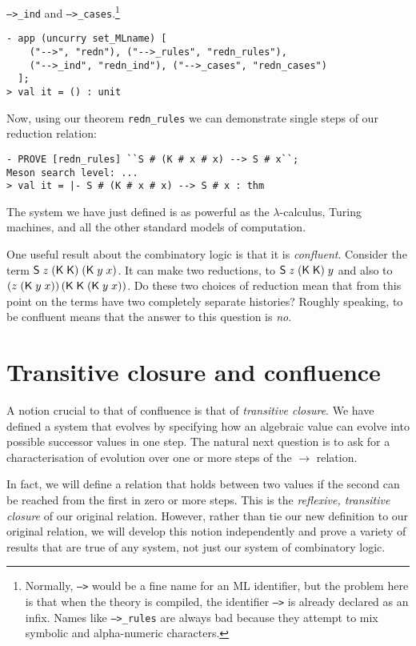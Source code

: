 \texttt{-->\_ind} and \texttt{-->\_cases}.\footnote{Normally,
  \texttt{-->} would be a fine name for an ML identifier, but the
  problem here is that when the theory is compiled, the identifier
  \texttt{-->} is already declared as an infix.  Names like
  \texttt{-->\_rules} are always bad because they attempt to mix
  symbolic and alpha-numeric characters.}
\begin{session}
\begin{verbatim}
- app (uncurry set_MLname) [
    ("-->", "redn"), ("-->_rules", "redn_rules"),
    ("-->_ind", "redn_ind"), ("-->_cases", "redn_cases")
  ];
> val it = () : unit
\end{verbatim}
\end{session}


Now, using our theorem \texttt{redn\_rules} we can demonstrate single
steps of our reduction relation:
\begin{session}
\begin{verbatim}
- PROVE [redn_rules] ``S # (K # x # x) --> S # x``;
Meson search level: ...
> val it = |- S # (K # x # x) --> S # x : thm
\end{verbatim}
\end{session}
The system we have just defined is as powerful as the
$\lambda$-calculus, Turing machines, and all the other standard models
of computation.

One useful result about the combinatory logic is that it is
\emph{confluent}.  Consider the term ${\sf S}\;z\;({\sf K}\;{\sf K})\;({\sf K}\; y\;
x)$.  It can make two reductions, to ${\sf S}\;z\;({\sf K}\;{\sf K})\;y$ and also
to $(z\;({\sf K}\;y\;x))\,({\sf K}\;{\sf K}\;({\sf K}\;y\;x))$.  Do these two choices
of reduction mean that from this point on the terms have two
completely separate histories?  Roughly speaking, to be confluent
means that the answer to this question is \emph{no}.


\section{Transitive closure and confluence}
\label{sec:Transitive-Clos-Conf}

A notion crucial to that of confluence is that of \emph{transitive
  closure}.  We have defined a system that evolves by specifying how
an algebraic value can evolve into possible successor values in one
step.  The natural next question is to ask for a characterisation of
evolution over one or more steps of the $\rightarrow$ relation.

In fact, we will define a relation that holds between two values if
the second can be reached from the first in zero or more steps.  This
is the \emph{reflexive, transitive closure} of our original relation.
However, rather than tie our new definition to our original relation,
we will develop this notion independently and prove a variety of
results that are true of any system, not just our system of
combinatory logic.

